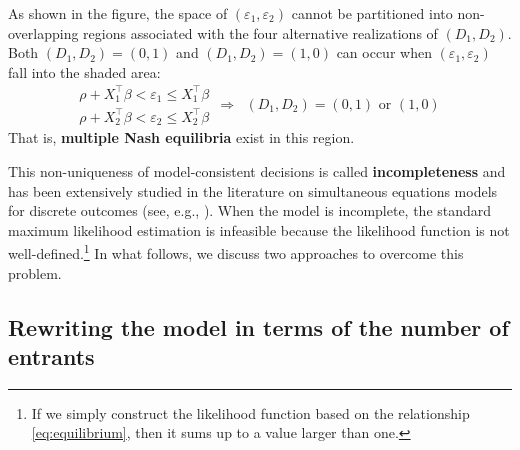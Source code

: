 \documentclass[10.5pt, A4paper, openany, uplatex]{book}
\newcommand{\eps}{\varepsilon}
\numberwithin{equation}{section}
\begin{document}
As shown in the figure, the space of $(\eps_1, \eps_2)$ cannot be partitioned into non-overlapping regions associated with the four alternative realizations of $(D_1, D_2)$.
Both $(D_1,D_2) = (0, 1)$ and $(D_1, D_2) = (1, 0)$ can occur when $(\eps_1, \eps_2)$ fall into the shaded area:
\[
	\begin{array}{l}
		\rho + X_1^\top\beta < \eps_1 \le X_1^\top\beta \\
		\rho + X_2^\top\beta < \eps_2 \le X_2^\top\beta
	\end{array} 
	\begin{array}{ll}
		\Longrightarrow & \text{$(D_1, D_2) = (0,1)$ or $(1,0)$}
	\end{array}
\]
That is, \textbf{multiple Nash equilibria} exist in this region.

This non-uniqueness of model-consistent decisions is called \textbf{incompleteness} and has been extensively studied in the literature on simultaneous equations models for discrete outcomes (see, e.g., \cite{tamer2003incomplete}).
When the model is incomplete, the standard maximum likelihood estimation is infeasible because the likelihood function is not well-defined.\footnote{
	If we simply construct the likelihood function based on the relationship \eqref{eq:equilibrium}, then it sums up to a value larger than one.
	}
In what follows, we discuss two approaches to overcome this problem.

\subsection{Rewriting the model in terms of the number of entrants}
\end{document}
